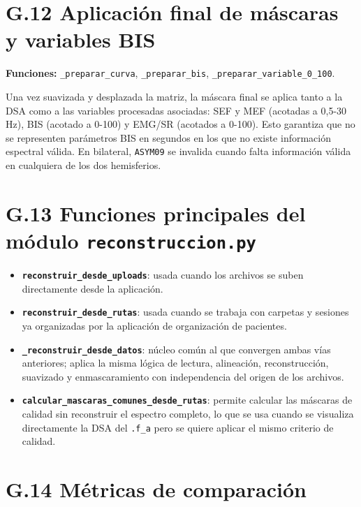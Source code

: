 \documentclass[
  spanish,
  a4paper,
  12pt,
  twoside]{memoir}
\providecommand{\tightlist}{%
  \setlength{\itemsep}{0pt}\setlength{\parskip}{0pt}}
\begin{document}
\chapter{G.12 Aplicación final de máscaras y variables
BIS}\label{g.12-aplicaciuxf3n-final-de-muxe1scaras-y-variables-bis}

\textbf{Funciones:} \texttt{\_preparar\_curva},
\texttt{\_preparar\_bis}, \texttt{\_preparar\_variable\_0\_100}.

Una vez suavizada y desplazada la matriz, la máscara final se aplica
tanto a la DSA como a las variables procesadas asociadas: SEF y MEF
(acotadas a 0,5-30 Hz), BIS (acotado a 0-100) y EMG/SR (acotados a
0-100). Esto garantiza que no se representen parámetros BIS en segundos
en los que no existe información espectral válida. En bilateral,
\texttt{ASYM09} se invalida cuando falta información válida en
cualquiera de los dos hemisferios.

\chapter{\texorpdfstring{G.13 Funciones principales del módulo
\texttt{reconstruccion.py}}{G.13 Funciones principales del módulo reconstruccion.py}}\label{g.13-funciones-principales-del-muxf3dulo-reconstruccion.py}

\begin{itemize}
\tightlist
\item
  \textbf{\texttt{reconstruir\_desde\_uploads}}: usada cuando los
  archivos se suben directamente desde la aplicación.
\item
  \textbf{\texttt{reconstruir\_desde\_rutas}}: usada cuando se trabaja
  con carpetas y sesiones ya organizadas por la aplicación de
  organización de pacientes.
\item
  \textbf{\texttt{\_reconstruir\_desde\_datos}}: núcleo común al que
  convergen ambas vías anteriores; aplica la misma lógica de lectura,
  alineación, reconstrucción, suavizado y enmascaramiento con
  independencia del origen de los archivos.
\item
  \textbf{\texttt{calcular\_mascaras\_comunes\_desde\_rutas}}: permite
  calcular las máscaras de calidad sin reconstruir el espectro completo,
  lo que se usa cuando se visualiza directamente la DSA del
  \texttt{.f\_a} pero se quiere aplicar el mismo criterio de calidad.
\end{itemize}

\chapter{G.14 Métricas de
comparación}\label{g.14-muxe9tricas-de-comparaciuxf3n}
\end{document}
